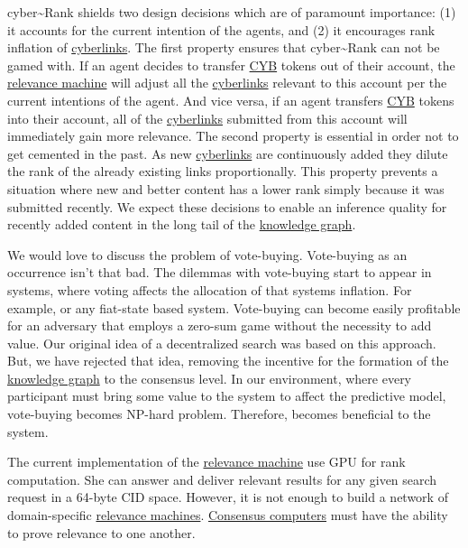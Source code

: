 \documentclass[8pt,oneside]{amsart}
\newcommand{\linkgreen}[2]{\href{#1}{\color{green}{#2}}}
\begin{document}
cyber\~{}Rank shields two design decisions which are of paramount importance: (1) it accounts for the current intention of the agents, and (2) it encourages rank inflation of {\hyperref[cyberlinks]{cyberlinks}}. The first property ensures that cyber\~{}Rank can not be gamed with. If an agent decides to transfer {\hyperref[cyb]{CYB}} tokens out of their account, the {\hyperref[relevance-machine]{relevance machine}} will adjust all the {\hyperref[cyberlinks]{cyberlinks}} relevant to this account per the current intentions of the agent. And vice versa, if an agent transfers {\hyperref[cyb]{CYB}} tokens into their account, all of the {\hyperref[cyberlinks]{cyberlinks}} submitted from this account will immediately gain more relevance. The second property is essential in order not to get cemented in the past. As new {\hyperref[cyberlinks]{cyberlinks}} are continuously added they dilute the rank of the already existing links proportionally. This property prevents a situation where new and better content has a lower rank simply because it was submitted recently. We expect these decisions to enable an inference quality for recently added content in the long tail of the {\hyperref[knowledge-graph]{knowledge graph}}.

We would love to discuss the problem of vote-buying. Vote-buying as an occurrence isn't that bad. The dilemmas with vote-buying start to appear in systems, where voting affects the allocation of that systems inflation. For example, \linkgreen{http://ipfs.io/ipfs/QmepU77tqMAHHuiSASUvUnu8f8ENuPF2Kfs97WjLn8vAS3}{Steem}
or any fiat-state based system. Vote-buying can become easily profitable for an adversary that employs a zero-sum game without the necessity to add value. Our original idea of a decentralized search was based on this approach. But, we have rejected that idea, removing the incentive for the formation of the {\hyperref[knowledge-graph]{knowledge graph}} to the consensus level. In our environment, where every participant must bring some value to the system to affect the predictive model, vote-buying becomes NP-hard problem. Therefore, becomes beneficial to the system.

The current implementation of the {\hyperref[relevance-machine]{relevance machine}} use GPU for rank computation. She can answer and deliver relevant results for any given search request in a 64-byte CID space. However, it is not enough to build a network of domain-specific {\hyperref[relevance-machine]{relevance machines}}. {\hyperref[consensus-computer]{Consensus computers}} must have the ability to prove relevance to one another.
\end{document}
